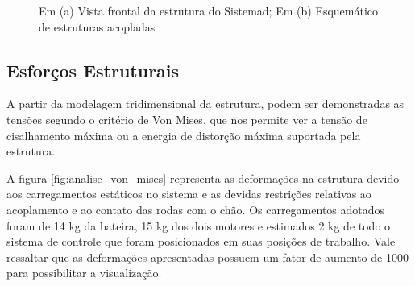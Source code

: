\begin{figure}[!ht]
  \caption{Em (a) Vista frontal da estrutura do Sistemad; Em (b) Esquemático de estruturas acopladas}\label{fig:vista_frontal_e_esquematico_acoplamento}
\end{figure}

 \subsection{Esforços Estruturais}

 A partir da modelagem tridimensional da estrutura, podem ser demonstradas as tensões segundo o critério de Von Mises, que nos permite ver a tensão de cisalhamento máxima ou a energia de distorção máxima suportada pela estrutura.

 A figura \ref{fig:analise_von_mises} representa as deformações na estrutura devido aos carregamentos estáticos no sistema e as devidas restrições relativas ao acoplamento e ao contato das rodas com o chão. Os carregamentos adotados foram de 14 kg da bateira, 15 kg dos dois motores e estimados 2 kg de todo o sistema de controle que foram posicionados em suas posições de trabalho. Vale ressaltar que as deformações apresentadas possuem um fator de aumento de 1000 para possibilitar a visualização.

